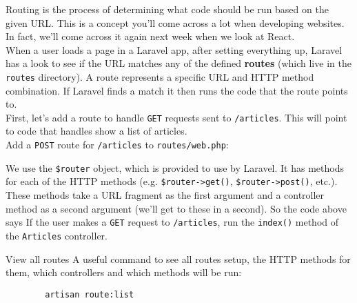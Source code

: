 Routing is the process of determining what code should be run based on the given URL. This is a concept you'll come across a lot when developing websites. In fact, we'll come across it again next week when we look at React.
\\

When a user loads a page in a Laravel app, after setting everything up, Laravel has a look to see if the URL matches any of the defined \textbf{routes} (which live in the \texttt{routes} directory). A route represents a specific URL and HTTP method combination. If Laravel finds a match it then runs the code that the route points to.
\\

First, let's add a route to handle \texttt{GET} requests sent to \texttt{/articles}. This will point to code that handles show a list of articles.
\\

Add a \texttt{POST} route for \texttt{/articles} to \texttt{routes/web.php}:


We use the \texttt{\$router} object, which is provided to use by Laravel. It has methods for each of the HTTP methods (e.g. \texttt{\$router->get()}, \texttt{\$router->post()}, etc.). These methods take a URL fragment as the first argument and a controller  method as a second argument (we'll get to these in a second). So the code above says If the user makes a \texttt{GET} request to \texttt{/articles}, run the \texttt{index()} method of the \texttt{Articles} controller.

\begin{infobox}{View all routes}
    A useful command to see all routes setup, the HTTP methods for them, which controllers and which methods will be run:

    \begin{verbatim}
        artisan route:list
    \end{verbatim}

\end{infobox}
